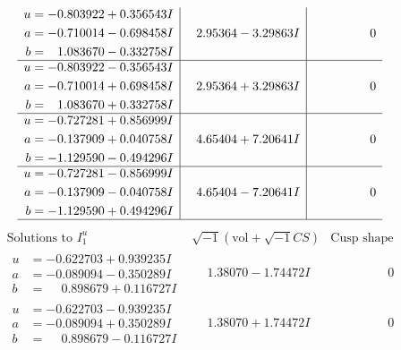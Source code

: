 \documentclass[1p]{elsarticle_modified}
\theoremstyle{definition}
\newcommand{\I}{\sqrt{-1}}
\begin{document}
$$\begin{array}{c|c|c}
\begin{aligned}
u &= -0.803922 + 0.356543 I \\
a &= -0.710014 - 0.698458 I \\
b &= \phantom{-}1.083670 - 0.332758 I\end{aligned}
 & \phantom{-}2.95364 - 3.29863 I & \phantom{-0.000000 } 0 \\ \hline\begin{aligned}
u &= -0.803922 - 0.356543 I \\
a &= -0.710014 + 0.698458 I \\
b &= \phantom{-}1.083670 + 0.332758 I\end{aligned}
 & \phantom{-}2.95364 + 3.29863 I & \phantom{-0.000000 } 0 \\ \hline\begin{aligned}
u &= -0.727281 + 0.856999 I \\
a &= -0.137909 + 0.040758 I \\
b &= -1.129590 - 0.494296 I\end{aligned}
 & \phantom{-}4.65404 + 7.20641 I & \phantom{-0.000000 } 0 \\ \hline\begin{aligned}
u &= -0.727281 - 0.856999 I \\
a &= -0.137909 - 0.040758 I \\
b &= -1.129590 + 0.494296 I\end{aligned}
 & \phantom{-}4.65404 - 7.20641 I & \phantom{-0.000000 } 0\\
 \hline 
 \end{array}$$\newpage$$\begin{array}{c|c|c}  
\text{Solutions to }I^u_{1}& \I (\text{vol} + \sqrt{-1}CS) & \text{Cusp shape}\\
 \hline 
\begin{aligned}
u &= -0.622703 + 0.939235 I \\
a &= -0.089094 - 0.350289 I \\
b &= \phantom{-}0.898679 + 0.116727 I\end{aligned}
 & \phantom{-}1.38070 - 1.74472 I & \phantom{-0.000000 } 0 \\ \hline\begin{aligned}
u &= -0.622703 - 0.939235 I \\
a &= -0.089094 + 0.350289 I \\
b &= \phantom{-}0.898679 - 0.116727 I\end{aligned}
 & \phantom{-}1.38070 + 1.74472 I & \phantom{-0.000000 } 0 \\ \hline\begin{aligned}

\end{aligned}
\end{array}$$
\end{document}
